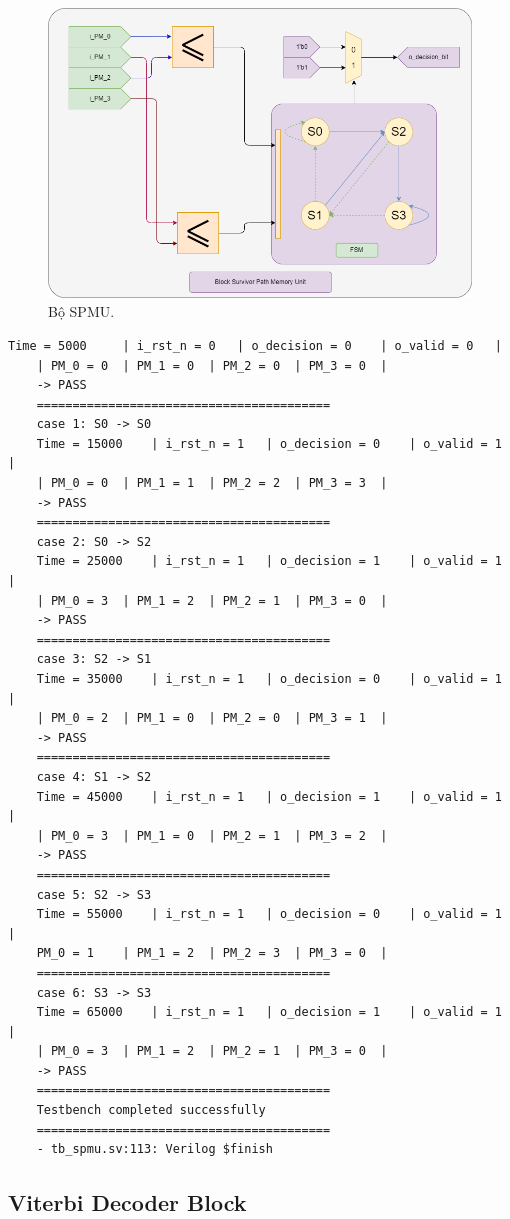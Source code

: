\begin{figure}[H]
	\centering
	\includegraphics[width=.8\linewidth]{sections/pic/mophongbangSystemVerilog/SPMU.png}
	\caption{Bộ SPMU.}
\end{figure}

\begin{lstlisting}[style=StyleResult, language=Result]
	Time = 5000 	| i_rst_n = 0 	| o_decision = 0 	| o_valid = 0 	|
	| PM_0 = 0 	| PM_1 = 0 	| PM_2 = 0 	| PM_3 = 0 	| 
	-> PASS
	=========================================
	case 1: S0 -> S0
	Time = 15000 	| i_rst_n = 1 	| o_decision = 0 	| o_valid = 1 	|
	| PM_0 = 0 	| PM_1 = 1 	| PM_2 = 2 	| PM_3 = 3 	| 
	-> PASS
	=========================================
	case 2: S0 -> S2
	Time = 25000 	| i_rst_n = 1 	| o_decision = 1 	| o_valid = 1 	|
	| PM_0 = 3 	| PM_1 = 2 	| PM_2 = 1 	| PM_3 = 0 	|
	-> PASS 
	=========================================
	case 3: S2 -> S1
	Time = 35000 	| i_rst_n = 1 	| o_decision = 0 	| o_valid = 1 	|
	| PM_0 = 2 	| PM_1 = 0 	| PM_2 = 0 	| PM_3 = 1 	| 
	-> PASS
	=========================================
	case 4: S1 -> S2
	Time = 45000 	| i_rst_n = 1 	| o_decision = 1 	| o_valid = 1 	|
	| PM_0 = 3 	| PM_1 = 0 	| PM_2 = 1 	| PM_3 = 2 	| 
	-> PASS
	=========================================
	case 5: S2 -> S3
	Time = 55000 	| i_rst_n = 1 	| o_decision = 0 	| o_valid = 1 	|
	PM_0 = 1 	| PM_1 = 2 	| PM_2 = 3 	| PM_3 = 0 	| 
	=========================================
	case 6: S3 -> S3
	Time = 65000 	| i_rst_n = 1 	| o_decision = 1 	| o_valid = 1 	|
	| PM_0 = 3 	| PM_1 = 2 	| PM_2 = 1 	| PM_3 = 0 	| 
	-> PASS
	=========================================
	Testbench completed successfully
	=========================================
	- tb_spmu.sv:113: Verilog $finish
\end{lstlisting}

\subsection{Viterbi Decoder Block}

